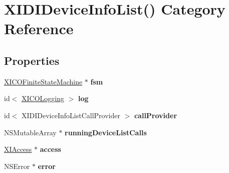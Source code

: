 \hypertarget{category_x_i_d_i_device_info_list_07_08}{}\section{X\+I\+D\+I\+Device\+Info\+List() Category Reference}
\label{category_x_i_d_i_device_info_list_07_08}
\subsection*{Properties}
\begin{DoxyCompactItemize}
\item 
\hypertarget{category_x_i_d_i_device_info_list_07_08_a008091b8630114fa5695e625a8a6832c}{}\label{category_x_i_d_i_device_info_list_07_08_a008091b8630114fa5695e625a8a6832c} 
\hyperlink{class_x_i_c_o_finite_state_machine}{X\+I\+C\+O\+Finite\+State\+Machine} $\ast$ {\bfseries fsm}
\item 
\hypertarget{category_x_i_d_i_device_info_list_07_08_a231f248d7e18dece9f1ac947769f7d67}{}\label{category_x_i_d_i_device_info_list_07_08_a231f248d7e18dece9f1ac947769f7d67} 
id$<$ \hyperlink{protocol_x_i_c_o_logging-p}{X\+I\+C\+O\+Logging} $>$ {\bfseries log}
\item 
\hypertarget{category_x_i_d_i_device_info_list_07_08_a49f13cb9cdd703e76333cda5aad8b877}{}\label{category_x_i_d_i_device_info_list_07_08_a49f13cb9cdd703e76333cda5aad8b877} 
id$<$ X\+I\+D\+I\+Device\+Info\+List\+Call\+Provider $>$ {\bfseries call\+Provider}
\item 
\hypertarget{category_x_i_d_i_device_info_list_07_08_ab616e5eae4095996332566f767c5daa0}{}\label{category_x_i_d_i_device_info_list_07_08_ab616e5eae4095996332566f767c5daa0} 
N\+S\+Mutable\+Array $\ast$ {\bfseries running\+Device\+List\+Calls}
\item 
\hypertarget{category_x_i_d_i_device_info_list_07_08_aa45e5a6cf81c8c53c419eeb108dda564}{}\label{category_x_i_d_i_device_info_list_07_08_aa45e5a6cf81c8c53c419eeb108dda564} 
\hyperlink{class_x_i_access}{X\+I\+Access} $\ast$ {\bfseries access}
\item 
\hypertarget{category_x_i_d_i_device_info_list_07_08_a86387ac46424da06ac982d4e119acd1c}{}\label{category_x_i_d_i_device_info_list_07_08_a86387ac46424da06ac982d4e119acd1c} 
N\+S\+Error $\ast$ {\bfseries error}
\item 
\hypertarget{category_x_i_d_i_device_info_list_07_08_a139782b36c6ae7edd6ec9eafd9cd83dd}{}\label{category_x_i_d_i_device_info_list_07_08_a139782b36c6ae7edd6ec9eafd9cd83dd} 

\end{DoxyCompactItemize}
